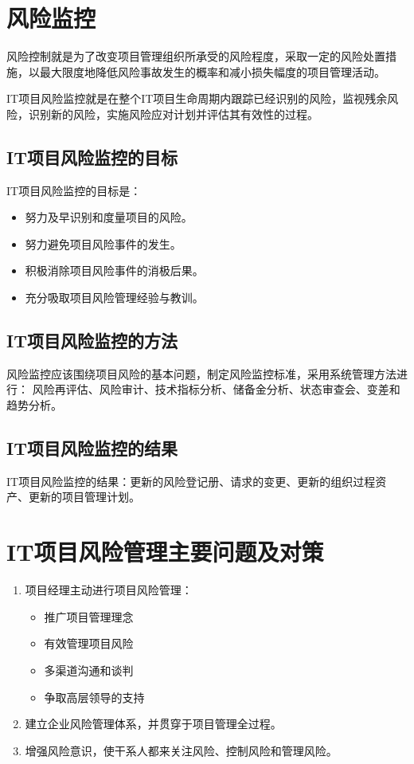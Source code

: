 \section{风险监控}
风险控制就是为了改变项目管理组织所承受的风险程度，采取一定的风险处置措施，以最大限度地降低风险事故发生的概率和减小损失幅度的项目管理活动。 
\par IT项目风险监控就是在整个IT项目生命周期内跟踪已经识别的风险，监视残余风险，识别新的风险，实施风险应对计划并评估其有效性的过程。 
\subsection{IT项目风险监控的目标}
IT项目风险监控的目标是：
\begin{itemize}
	\item 努力及早识别和度量项目的风险。
	\item 努力避免项目风险事件的发生。
	\item 积极消除项目风险事件的消极后果。
	\item 充分吸取项目风险管理经验与教训。
\end{itemize}
\subsection{IT项目风险监控的方法}
风险监控应该围绕项目风险的基本问题，制定风险监控标准，采用系统管理方法进行：
风险再评估、风险审计、技术指标分析、储备金分析、状态审查会、变差和趋势分析。
\subsection{IT项目风险监控的结果}
IT项目风险监控的结果：更新的风险登记册、请求的变更、更新的组织过程资产、更新的项目管理计划。
\section{IT项目风险管理主要问题及对策}
\begin{enumerate}

\item 项目经理主动进行项目风险管理：
\begin{itemize}
	\item 推广项目管理理念
	\item 有效管理项目风险 
	\item 多渠道沟通和谈判 
	\item 争取高层领导的支持
\end{itemize}
\item 建立企业风险管理体系，并贯穿于项目管理全过程。
	\item 增强风险意识，使干系人都来关注风险、控制风险和管理风险。
\end{enumerate}
